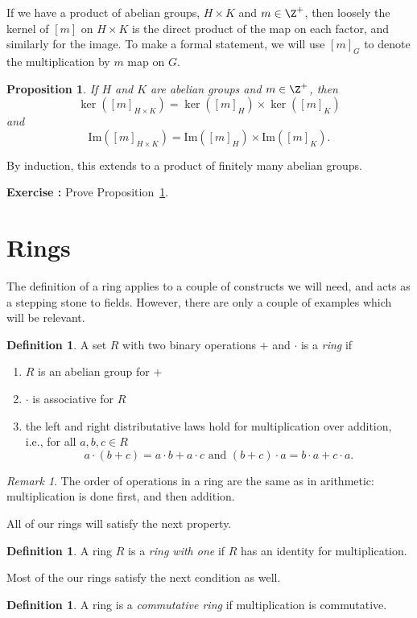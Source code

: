 \documentclass[12pt]{amsart}
\renewcommand{\Im}{\mathrm{Im}} %
\newcounter{probs}
\newenvironment{prob}{%
  \refstepcounter{probs}
  \par\medskip\noindent\textbf{Exercise \theprobs:} }{\par\medskip}
\theoremstyle{plain}
\newtheorem{prop}[thm]{Proposition}
\theoremstyle{definition}
\newtheorem{defn}[thm]{Definition}
\theoremstyle{remark}
\newtheorem*{remark}{Remark}
\begin{document}
If we have a product of abelian groups, $H\times K$ and $m\in\Z^+$,
then loosely the kernel of $[m]$ on $H\times K$ is the direct product
of the map on each factor, and similarly for the image.  To make a
formal statement, we will use $[m]_G$ to denote the multiplication by
$m$ map on $G$.

\begin{prop}\label{prodker}
  If $H$ and $K$ are abelian groups and $m\in\Z^+$, then
\[ \ker([m]_{H\times K}) = \ker([m]_H)\times \ker([m]_K)\]
and
\[ \Im([m]_{H\times K}) = \Im([m]_H)\times \Im([m]_K).\]
\end{prop}
By induction, this extends to a product of finitely many abelian
groups.
\begin{prob}
  Prove Proposition~\ref{prodker}.
\end{prob}

\section{Rings}
The definition of a ring applies to a couple of constructs we will
need, and acts as a stepping stone to fields.  However, there are only
a couple of examples which will be relevant.

\begin{defn}
  A set $R$ with two binary operations $+$ and $\cdot$ is a \emph{ring}
  if 
  \begin{enumerate}
  \item $R$ is an abelian group for $+$
  \item $\cdot $ is associative for $R$
  \item the left and right distributative laws hold for multiplication
    over addition, i.e., for all $a,b,c\in R$
    \[a\cdot(b+c) = a\cdot b+a\cdot c \text{ and } (b+c)\cdot a=b\cdot
    a+c\cdot a.\]
  \end{enumerate}
\end{defn}
\begin{remark}
  The order of operations in a ring are the same as in arithmetic:
  multiplication is done first, and then addition.
\end{remark}
All of our rings will satisfy the next property.
\begin{defn}
  A ring $R$ is a \emph{ring with one} if $R$ has an identity for
  multiplication.
\end{defn}
Most of the our rings satisfy the next condition as well.
\begin{defn}
  A ring is a \emph{commutative ring} if multiplication is
  commutative.
\end{defn}
\end{document}
